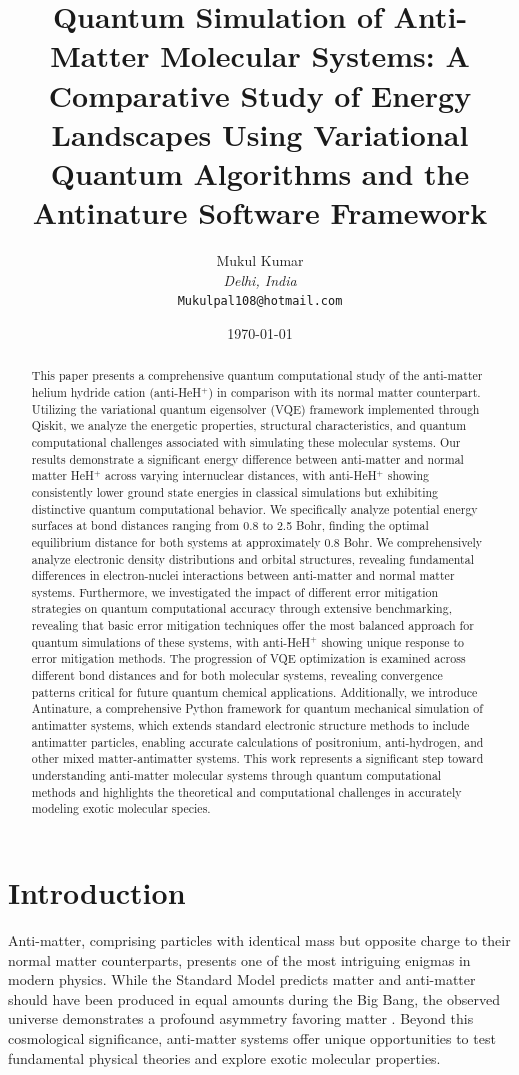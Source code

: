 \documentclass[10pt,twocolumn,a4paper]{article}
\title{\textbf{Quantum Simulation of Anti-Matter Molecular Systems: A Comparative Study of Energy Landscapes Using Variational Quantum Algorithms and the Antinature Software Framework}}
\author{Mukul Kumar\\
\textit{Delhi, India}\\
\texttt{Mukulpal108@hotmail.com}
}
\date{\today}
\begin{document}
\maketitle

\begin{abstract}
This paper presents a comprehensive quantum computational study of the anti-matter helium hydride cation (anti-HeH$^+$) in comparison with its normal matter counterpart. Utilizing the variational quantum eigensolver (VQE) framework implemented through Qiskit, we analyze the energetic properties, structural characteristics, and quantum computational challenges associated with simulating these molecular systems. Our results demonstrate a significant energy difference between anti-matter and normal matter HeH$^+$ across varying internuclear distances, with anti-HeH$^+$ showing consistently lower ground state energies in classical simulations but exhibiting distinctive quantum computational behavior. We specifically analyze potential energy surfaces at bond distances ranging from 0.8 to 2.5 Bohr, finding the optimal equilibrium distance for both systems at approximately 0.8 Bohr. We comprehensively analyze electronic density distributions and orbital structures, revealing fundamental differences in electron-nuclei interactions between anti-matter and normal matter systems. Furthermore, we investigated the impact of different error mitigation strategies on quantum computational accuracy through extensive benchmarking, revealing that basic error mitigation techniques offer the most balanced approach for quantum simulations of these systems, with anti-HeH$^+$ showing unique response to error mitigation methods. The progression of VQE optimization is examined across different bond distances and for both molecular systems, revealing convergence patterns critical for future quantum chemical applications. Additionally, we introduce Antinature, a comprehensive Python framework for quantum mechanical simulation of antimatter systems, which extends standard electronic structure methods to include antimatter particles, enabling accurate calculations of positronium, anti-hydrogen, and other mixed matter-antimatter systems. This work represents a significant step toward understanding anti-matter molecular systems through quantum computational methods and highlights the theoretical and computational challenges in accurately modeling exotic molecular species.
\end{abstract}

\section{Introduction}
Anti-matter, comprising particles with identical mass but opposite charge to their normal matter counterparts, presents one of the most intriguing enigmas in modern physics. While the Standard Model predicts matter and anti-matter should have been produced in equal amounts during the Big Bang, the observed universe demonstrates a profound asymmetry favoring matter \cite{baker2021matter}. Beyond this cosmological significance, anti-matter systems offer unique opportunities to test fundamental physical theories and explore exotic molecular properties.
\end{document}
